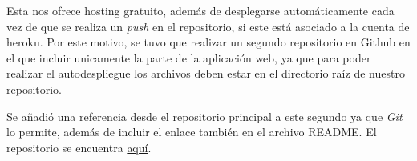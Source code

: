 Esta nos ofrece hosting gratuito, además de desplegarse automáticamente cada vez de que se realiza un \emph{push} en el repositorio, si este está asociado a la cuenta de heroku. Por este motivo, se tuvo que realizar un segundo repositorio en Github en el que incluir unicamente la parte de la aplicación web, ya que para poder realizar el autodespliegue los archivos deben estar en el directorio raíz de nuestro repositorio.

Se añadió una referencia desde el repositorio principal a este segundo ya que \emph{Git} lo permite, además de incluir el enlace también en el archivo README. El repositorio se encuentra  \href{https://github.com/psnti/WebJellyfishForecast#tfg---pablo-santidrian-tudanca}{aquí}.


